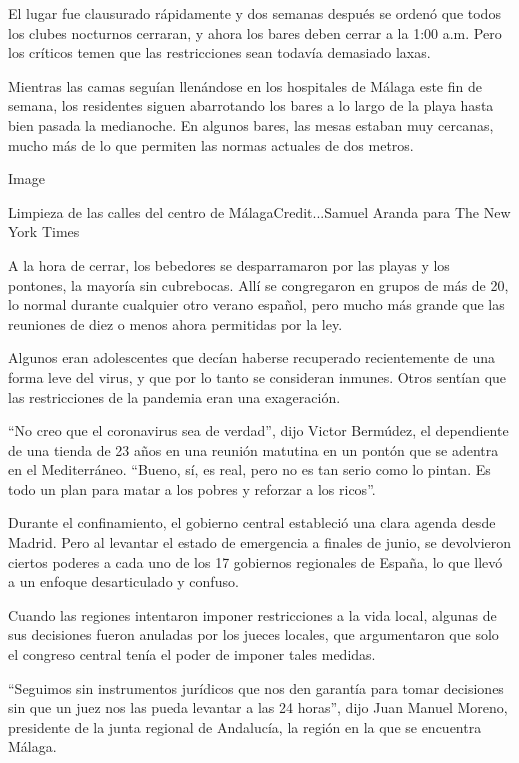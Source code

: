 El lugar fue clausurado rápidamente y dos semanas después se ordenó que
todos los clubes nocturnos cerraran, y ahora los bares deben cerrar a la
1:00 a.m. Pero los críticos temen que las restricciones sean todavía
demasiado laxas.

Mientras las camas seguían llenándose en los hospitales de Málaga este
fin de semana, los residentes siguen abarrotando los bares a lo largo de
la playa hasta bien pasada la medianoche. En algunos bares, las mesas
estaban muy cercanas, mucho más de lo que permiten las normas actuales
de dos metros.

Image

Limpieza de las calles del centro de MálagaCredit...Samuel Aranda para
The New York Times

A la hora de cerrar, los bebedores se desparramaron por las playas y los
pontones, la mayoría sin cubrebocas. Allí se congregaron en grupos de
más de 20, lo normal durante cualquier otro verano español, pero mucho
más grande que las reuniones de diez o menos ahora permitidas por la
ley.

Algunos eran adolescentes que decían haberse recuperado recientemente de
una forma leve del virus, y que por lo tanto se consideran inmunes.
Otros sentían que las restricciones de la pandemia eran una exageración.

``No creo que el coronavirus sea de verdad'', dijo Victor Bermúdez, el
dependiente de una tienda de 23 años en una reunión matutina en un
pontón que se adentra en el Mediterráneo. ``Bueno, sí, es real, pero no
es tan serio como lo pintan. Es todo un plan para matar a los pobres y
reforzar a los ricos''.

Durante el confinamiento, el gobierno central estableció una clara
agenda desde Madrid. Pero al levantar el estado de emergencia a finales
de junio, se devolvieron ciertos poderes a cada uno de los 17 gobiernos
regionales de España, lo que llevó a un enfoque desarticulado y confuso.

Cuando las regiones intentaron imponer restricciones a la vida local,
algunas de sus decisiones fueron anuladas por los jueces locales, que
argumentaron que solo el congreso central tenía el poder de imponer
tales medidas.

``Seguimos sin instrumentos jurídicos que nos den garantía para tomar
decisiones sin que un juez nos las pueda levantar a las 24 horas'', dijo
Juan Manuel Moreno, presidente de la junta regional de Andalucía, la
región en la que se encuentra Málaga.

